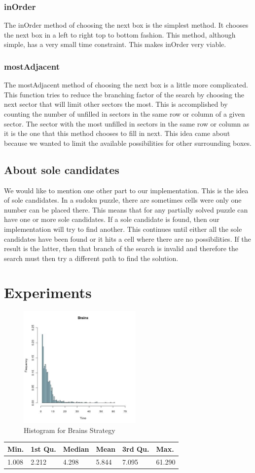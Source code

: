 \documentclass[letterpaper]{article}
\begin{document}
\subsubsection{inOrder}

The inOrder method of choosing the next box is the simplest method. It chooses the next box in a left to right top to bottom fashion. This method, although simple, has a very small time constraint. This makes inOrder very viable.

\subsubsection{mostAdjacent}

The mostAdjacent method of choosing the next box is a little more complicated. This function tries to reduce the branching factor of the search by choosing the next sector that will limit other sectors the most. This is accomplished by counting the number of unfilled in sectors in the same row or column of a given sector. The sector with the most unfilled in sectors in the same row or column as it is the one that this method chooses to fill in next. This idea came about because we wanted to limit the available possibilities for other surrounding boxes.

\subsection{About sole candidates}

We would like to mention one other part to our implementation. This is the idea of sole candidates. In a sudoku puzzle, there are sometimes cells were only one number can be placed there. This means that for any partially solved puzzle can have one or more sole candidates. If a sole candidate is found, then our implementation will try to find another. This continues until either all the sole candidates have been found or it hits a cell where there are no possibilities. If the result is the latter, then that branch of the search is invalid and therefore the search must then try a different path to find the solution.

\section{Experiments}
	\begin{figure}[h]
		\centering
		\includegraphics[width=60mm]{./brains_stats.jpg}
		\caption{Histogram for Brains Strategy}
	\label{fig:brains-strategy}
\end{figure}

\begin{tabular}{|l|l|l|l|l|l|}
\hline
Min. & 1st Qu.  & Median & Mean & 3rd Qu. & Max. \\
\hline
  1.008 & 2.212 & 4.298 & 5.844 & 7.095 & 61.290\\
\hline
\end{tabular}
\end{document}
